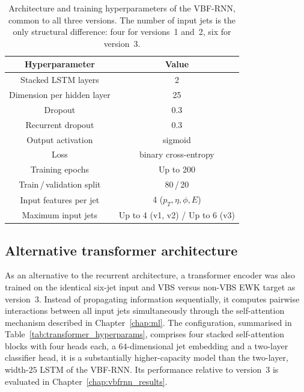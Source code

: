 \begin{table}[htbp]
  \centering
  \caption{Architecture and training hyperparameters of the VBF-RNN, common to all three versions. The number of input jets is the only structural difference: four for versions~1 and~2, six for version~3.}
  \label{tab:rnn_hyperparams}
  \begin{tabular}{|c|c|}
    \hline
    \textbf{Hyperparameter} & \textbf{Value} \\
    \hline
    Stacked LSTM layers          & 2 \\
    Dimension per hidden layer   & 25 \\
    Dropout                      & 0.3 \\
    Recurrent dropout            & 0.3 \\
    Output activation            & sigmoid \\
    Loss                         & binary cross-entropy \\
    Training epochs              & Up to 200\\
    Train\,/\,validation split   & 80\,/\,20 \\
    Input features per jet       & 4 ($p_T,\eta,\phi,E$) \\
    Maximum input jets                   & Up to 4 (v1, v2) / Up to 6 (v3) \\
    \hline
  \end{tabular}
\end{table}

\subsection{Alternative transformer architecture}

As an alternative to the recurrent architecture, a transformer encoder was also trained on the identical six-jet input and VBS versus non-VBS EWK target as version~3. Instead of propagating information sequentially, it computes pairwise interactions between all input jets simultaneously through the self-attention mechanism described in Chapter~\ref{chap:ml}. The configuration, summarised in Table~\ref{tab:transformer_hyperparams}, comprises four stacked self-attention blocks with four heads each, a $64$-dimensional jet embedding and a two-layer classifier head, it is a substantially higher-capacity model than the two-layer, width-$25$ LSTM of the VBF-RNN. Its performance relative to version~3 is evaluated in Chapter~\ref{chap:vbfrnn_results}.

